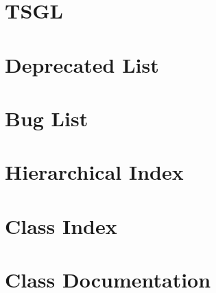 \documentclass[twoside]{book}
\begin{document}
\chapter{T\-S\-G\-L}
\label{md__home_kodemonkey__desktop__t_s_g_l_readme}
\hypertarget{md__home_kodemonkey__desktop__t_s_g_l_readme}{}

\chapter{Deprecated List}
\label{deprecated}
\hypertarget{deprecated}{}

\chapter{Bug List}
\label{bug}
\hypertarget{bug}{}

\chapter{Hierarchical Index}

\chapter{Class Index}

\chapter{Class Documentation}





































\newpage
{}
{}
\printindex
\end{document}

